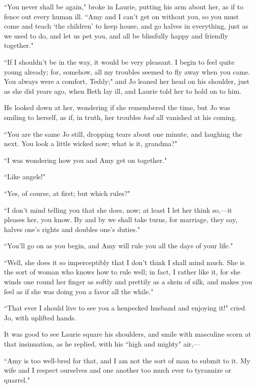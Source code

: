 ``You never shall be again," broke in Laurie, putting his arm about her,
as if to fence out every human ill. ``Amy and I can't get
on without you, so you must come and teach `the
children' to keep house, and go halves in everything,
just as we used to do, and let us pet you, and all be blissfully happy
and friendly together."

``If I shouldn't be in the way, it would be very
pleasant. I begin to feel quite young already; for, somehow, all my
troubles seemed to fly away when you came. You always were a comfort,
Teddy;" and Jo leaned her head on his shoulder, just as she did years
ago, when Beth lay ill, and Laurie told her to hold on to him.

He looked down at her, wondering if she remembered the time, but Jo was
smiling to herself, as if, in truth, her troubles \emph{had} all
vanished at his coming.

``You are the same Jo still, dropping tears about one minute, and
laughing the next. You look a little wicked now; what is it, grandma?"

``I was wondering how you and Amy get on together."

``Like angels!"

``Yes, of course, at first; but which rules?"

``I don't mind telling you that she does, now; at least I
let her think so,---it pleases her, you know. By and by we shall take
turns, for marriage, they say, halves one's rights and
doubles one's duties."

``You'll go on as you begin, and Amy will rule you all
the days of your life."

``Well, she does it so imperceptibly that I don't think I
shall mind much. She is the sort of woman who knows how to rule well; in
fact, I rather like it, for she winds one round her finger as softly and
prettily as a skein of silk, and makes you feel as if she was doing you
a favor all the while."

``That ever I should live to see you a henpecked husband and enjoying
it!" cried Jo, with uplifted hands.

It was good to see Laurie square his shoulders, and smile with masculine
scorn at that insinuation, as he replied, with his ``high and mighty"
air,---

``Amy is too well-bred for that, and I am not the sort of man to submit
to it. My wife and I respect ourselves and one another too much ever to
tyrannize or quarrel."

